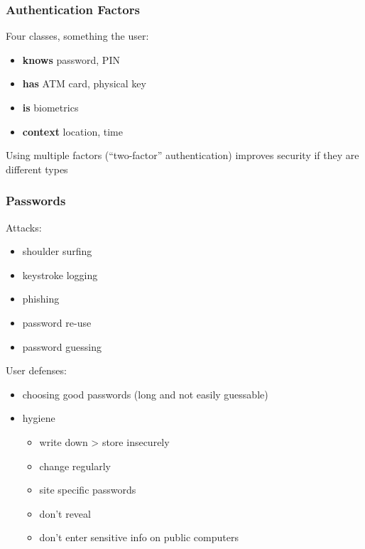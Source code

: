 \documentclass[]{article}
\theoremstyle{definition}
\begin{document}
	\subsubsection{Authentication Factors}
	Four classes, something the user:
	\begin{itemize}
		\item \textbf{knows} password, PIN
		\item \textbf{has} ATM card, physical key
		\item \textbf{is} biometrics
		\item \textbf{context} location, time
	\end{itemize}
	Using multiple factors (``two-factor'' authentication) improves security if they are different types

	\subsubsection{Passwords}
	Attacks:
	\begin{itemize}
		\item shoulder surfing
		\item keystroke logging
		\item phishing
		\item password re-use
		\item password guessing
	\end{itemize}

	User defenses:
	\begin{itemize}
		\item choosing good passwords (long and not easily guessable)
		\item hygiene
			\begin{itemize}
				\item write down > store insecurely
				\item change regularly
				\item site specific passwords
				\item don't reveal
				\item don't enter sensitive info on public computers
			\end{itemize}
	\end{itemize}
\end{document}
